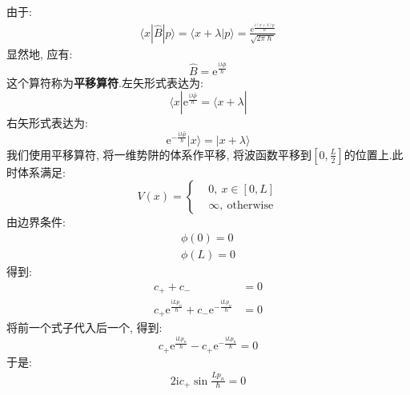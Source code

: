         由于:
        \begin{equation}\begin{aligned}
            \langle x|\hat{B}| p \rangle = \langle x+\lambda |p\rangle = \frac {\mathrm{e}^{\frac {\mathrm{i}(x+\lambda)p}{\hslash}}}{\sqrt{2\pi\hslash}}
        \end{aligned}\end{equation}
        显然地, 应有:
        \begin{equation}
            \hat{B} = \mathrm{e}^{\frac {\mathrm{i}\lambda \hat{p}}{\hslash}}
        \end{equation}
        这个算符称为\textbf{平移算符}.左矢形式表达为:
        \[ \langle x| \mathrm{e}^{\frac {\mathrm{i}\lambda \hat{p}}{\hslash}} = \langle x+\lambda| \]
        右矢形式表达为:
        \[ \mathrm{e}^{-\frac {\mathrm{i}\lambda \hat{p}}{\hslash}} | x\rangle = |x+\lambda \rangle \]
        我们使用平移算符, 将一维势阱的体系作平移, 
        将波函数平移到$[0,\frac L2]$的位置上.此时体系满足:
        \begin{equation}
            V(x) = \left \{
                \begin{aligned}
                    &0,\ x\in [0, L]\\
                    &\infty, \ \mathrm{otherwise}
                \end{aligned}
                \right.
        \end{equation}
        由边界条件:
        \begin{equation}\begin{aligned}
            \phi(0)= 0\\
            \phi(L) = 0
        \end{aligned}\end{equation}
        得到:
        \begin{equation}\begin{aligned}
            c_+ +c_- &= 0\\
            c_+\mathrm{e}^{\frac {\mathrm{i}Lp_n}{\hslash}}+c_-\mathrm{e}^{-\frac {\mathrm{i}Lp_n}{\hslash}} &= 0
        \end{aligned}\end{equation}
        将前一个式子代入后一个, 得到:
        \[ c_+\mathrm{e}^{\frac {\mathrm{i}Lp_n}{\hslash}}-c_+ \mathrm{e}^{-\frac {\mathrm{i}Lp_n}{\hslash}} = 0 \]
        于是:
        \begin{equation}\begin{aligned}
            2\mathrm{i}c_+ \sin{\frac {Lp_n}{\hslash}} = 0
        \end{aligned}\end{equation}
